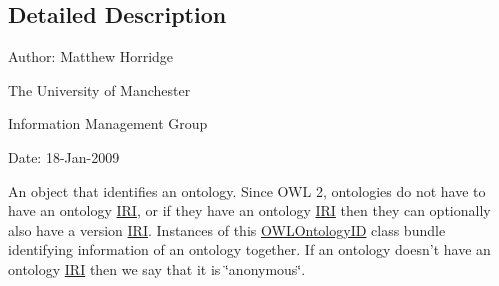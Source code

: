 \subsection{Detailed Description}
Author\-: Matthew Horridge\par
 The University of Manchester\par
 Information Management Group\par
 Date\-: 18-\/\-Jan-\/2009 

An object that identifies an ontology. Since O\-W\-L 2, ontologies do not have to have an ontology \hyperlink{classorg_1_1semanticweb_1_1owlapi_1_1model_1_1_i_r_i}{I\-R\-I}, or if they have an ontology \hyperlink{classorg_1_1semanticweb_1_1owlapi_1_1model_1_1_i_r_i}{I\-R\-I} then they can optionally also have a version \hyperlink{classorg_1_1semanticweb_1_1owlapi_1_1model_1_1_i_r_i}{I\-R\-I}. Instances of this \hyperlink{classorg_1_1semanticweb_1_1owlapi_1_1model_1_1_o_w_l_ontology_i_d}{O\-W\-L\-Ontology\-I\-D} class bundle identifying information of an ontology together. If an ontology doesn't have an ontology \hyperlink{classorg_1_1semanticweb_1_1owlapi_1_1model_1_1_i_r_i}{I\-R\-I} then we say that it is \char`\"{}anonymous\char`\"{}. 

